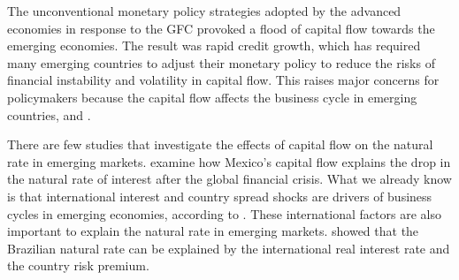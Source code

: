 \documentclass[12pt,oneside,a4paper]{article}
\begin{document}
The unconventional monetary policy strategies adopted by the advanced economies in response to the GFC provoked a flood of capital flow towards the emerging economies. The result was rapid credit growth, which has required many emerging countries to adjust their monetary policy to reduce the risks of financial instability and volatility in capital flow. This raises major concerns for policymakers because the capital flow affects the business cycle in emerging countries, \citet{Uribe:2016} and \citet{Cuadra:2019}. 


There are few studies that investigate the effects of capital flow on the  natural rate in emerging markets. \citet{Carrillo:2018} examine how Mexico's capital flow explains the drop in the natural rate of interest  after the global financial crisis. What we already know is that international interest and country spread shocks are drivers of business cycles in emerging economies, according to \citet{Uribe:2006}. These international factors are also important to explain the natural rate in emerging markets. \citet{Barbosa:2016} showed that the Brazilian natural rate can be explained by the international real interest rate and the country risk premium. 


\end{document}
